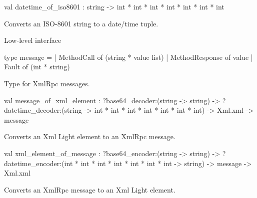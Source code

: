 \documentclass[11pt]{article}
\begin{document}
\label{val:XmlRpc.datetime-underscoreof-underscoreiso8601}\begin{ocamldoccode}
val datetime_of_iso8601 : string -> int * int * int * int * int * int * int
\end{ocamldoccode}
\begin{ocamldocdescription}
Converts an ISO-8601 string to a date/time tuple.


\end{ocamldocdescription}




Low-level interface



\label{type:XmlRpc.message}\begin{ocamldoccode}
type message =
  | MethodCall of (string * value list)
  | MethodResponse of value
  | Fault of (int * string)
\end{ocamldoccode}
\begin{ocamldocdescription}
Type for XmlRpc messages.


\end{ocamldocdescription}




\label{val:XmlRpc.message-underscoreof-underscorexml-underscoreelement}\begin{ocamldoccode}
val message_of_xml_element :
  ?base64_decoder:(string -> string) ->
  ?datetime_decoder:(string -> int * int * int * int * int * int * int) ->
  Xml.xml -> message
\end{ocamldoccode}
\begin{ocamldocdescription}
Converts an Xml Light element to an XmlRpc message.


\end{ocamldocdescription}




\label{val:XmlRpc.xml-underscoreelement-underscoreof-underscoremessage}\begin{ocamldoccode}
val xml_element_of_message :
  ?base64_encoder:(string -> string) ->
  ?datetime_encoder:(int * int * int * int * int * int * int -> string) ->
  message -> Xml.xml
\end{ocamldoccode}
\begin{ocamldocdescription}
Converts an XmlRpc message to an Xml Light element.


\end{ocamldocdescription}
\end{document}
